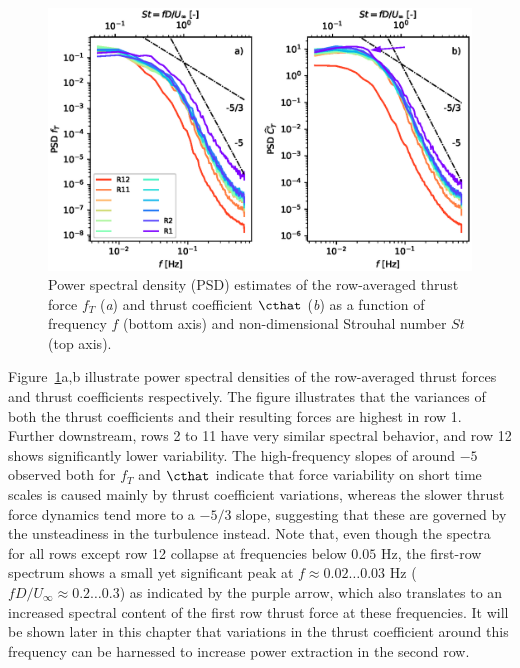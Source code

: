 	\begin{figure}
		\includegraphics[width=\textwidth]{chapters/analysis_induction_control/spectra_thrust_cthat.eps}
		\caption[Power spectral density (PSD) estimates of the row-averaged thrust force $f_T$ and thrust coefficient $\cthat$ as a function of frequency $f$ and non-dimensional Strouhal number $St$.]{Power spectral density (PSD) estimates of the row-averaged thrust force $f_T$ (\emph{a}) and thrust coefficient $\cthat$ (\emph{b}) as a function of frequency $f$ (bottom axis) and non-dimensional Strouhal number $St$ (top axis). \label{fig:spectra_thrust_cthat}}
	\end{figure}
	
	Figure~\ref{fig:spectra_thrust_cthat}a,b illustrate power spectral densities of the row-averaged thrust forces and thrust coefficients respectively. The figure illustrates that the variances of both the thrust coefficients and their resulting forces are highest in row 1. Further downstream, rows 2 to 11 have very similar spectral behavior, and row 12 shows significantly lower variability. The high-frequency slopes of around $-5$ observed both for $f_T$ and $\cthat$ indicate that force variability on short time scales is caused mainly by thrust coefficient variations, whereas the slower thrust force dynamics tend more to a $-5/3$ slope, suggesting that these are governed by the unsteadiness in the turbulence instead. Note that, even though the spectra for all rows except row 12 collapse at frequencies below $0.05$ Hz, the first-row spectrum shows a small yet significant peak at $f \approx 0.02 \dots 0.03$ Hz ($f D / U_\infty \approx 0.2 \dots 0.3$) as indicated by the purple arrow, which also translates to an increased spectral content of the first row thrust force at these frequencies. It will be shown later in this chapter that variations in the thrust coefficient around this frequency can be harnessed to increase power extraction in the second row. 

